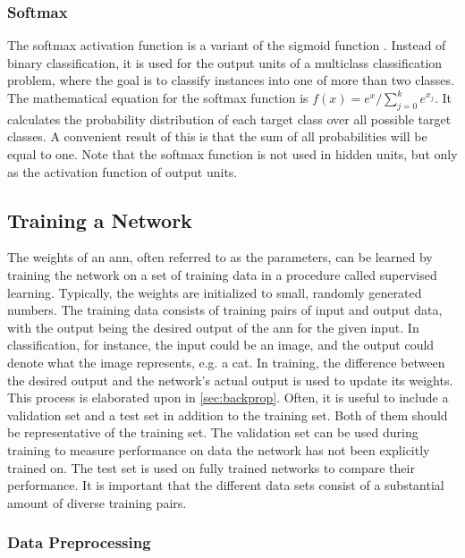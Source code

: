 \subsubsection{Softmax}

The softmax activation function is a variant of the sigmoid function \cite{softmax}. Instead of binary classification, it is used for the output units of a multiclass classification problem, where the goal is to classify instances into one of more than two classes. The mathematical equation for the softmax function is $f(x) = e^x/\sum_{j=0}^k e^{x_j}$. It calculates the probability distribution of each target class over all possible target classes. A convenient result of this is that the sum of all probabilities will be equal to one. Note that the softmax function is not used in hidden units, but only as the activation function of output units.

\subsection{Training a Network} \label{sec:training}

The weights of an \acrshort{ann}, often referred to as the parameters, can be learned by training the network on a set of training data in a procedure called supervised learning. Typically, the weights are initialized to small, randomly generated numbers. The training data consists of training pairs of input and output data, with the output being the desired output of the \acrshort{ann} for the given input. In classification, for instance, the input could be an image, and the output could denote what the image represents, e.g. a cat. In training, the difference between the desired output and the network's actual output is used to update its weights. This process is elaborated upon in \autoref{sec:backprop}. Often, it is useful to include a validation set and a test set in addition to the training set. Both of them should be representative of the training set. The validation set can be used during training to measure performance on data the network has not been explicitly trained on. The test set is used on fully trained networks to compare their performance. It is important that the different data sets consist of a substantial amount of diverse training pairs.

\subsubsection{Data Preprocessing}

